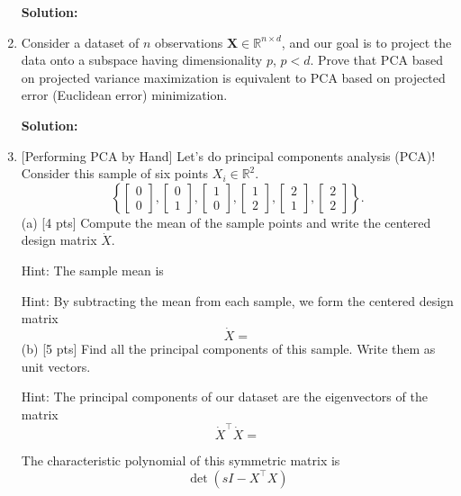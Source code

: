 \documentclass[10pt]{article}
\begin{document}
\begin{enumerate}[1.]
		  \textbf{Solution:}

	      \newpage 
    \item {} Consider a dataset of $n$ observations $\mathbf{X}\in         \mathbb{R}^{n \times d}$, and our goal is to project the data onto a           subspace having dimensionality $p$, $p<d$. 
	Prove that PCA based on projected variance maximization is equivalent to       PCA based on projected error (Euclidean error) minimization. \par
	\textbf{Solution:}
	
	\newpage
 \item {} [Performing PCA by Hand]
 Let's do principal components analysis (PCA)! Consider this sample of six points $X_i \in \mathbb{R}^2$.
$$
\left\{\left[\begin{array}{l}
0 \\
0
\end{array}\right],\left[\begin{array}{l}
0 \\
1
\end{array}\right],\left[\begin{array}{l}
1 \\
0
\end{array}\right],\left[\begin{array}{l}
1 \\
2
\end{array}\right],\left[\begin{array}{l}
2 \\
1
\end{array}\right],\left[\begin{array}{l}
2 \\
2
\end{array}\right]\right\} .
$$
(a) [4 pts] Compute the mean of the sample points and write the centered design matrix $\dot{X}$.

Hint: The sample mean is


Hint: By subtracting the mean from each sample, we form the centered design matrix
$$
\dot{X}=
$$
(b) [5 pts] Find all the principal components of this sample. Write them as unit vectors.

Hint: The principal components of our dataset are the eigenvectors of the matrix
$$
\dot{X}^{\top} \dot{X}=
$$

The characteristic polynomial of this symmetric matrix is
$$
\operatorname{det}\left(s I-X^{\top} X\right)
$$


\end{enumerate}
\end{document}
